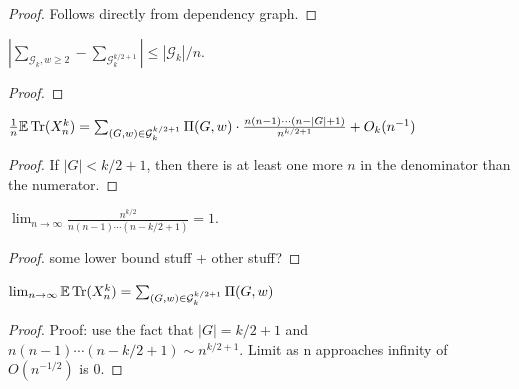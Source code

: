 \begin{proof}
  \notready
  Follows directly from dependency graph.
\end{proof}



\begin{proposition}
  \label{prop:g_difference_bound}
  \notready
  $|\sum_{\mathcal{G}_{k}, w \ge 2} - \sum_{\mathcal{G}_k^{k/2+1}}| \le |\mathcal{G}_k|/n$.
\end{proposition}

\begin{proof}
  \notready
\end{proof}



\begin{proposition}%
  \label{prop:trace_ev_special_g}
  \notready
  $\frac1n{\mathbb{E}}\operatorname{Tr}(X_n^k) = \sum_{(G,w)\in\mathcal{G}^{k/2+1}_k} \Pi(G,w) \cdot \frac{n(n-1)\cdots(n-|G|+1)}{n^{k/2+1}} + O_k(n^{-1})$
\end{proposition}

\begin{proof}
  \notready
  If $|G| < k/2 + 1$, then there is at least one more $n$ in the denominator than the numerator.
\end{proof}

\begin{proposition}
  \label{lemma:fraction_limit_one}
  \notready
  $\lim_{n\to\infty}\frac{n^{k/2}}{n(n-1)\cdots(n-k/2+1)} = 1$.
\end{proposition}

\begin{proof}
  \notready
  some lower bound stuff + other stuff?
\end{proof}


\begin{proposition}
  \label{prop:trace_ev_limit_equals_sum}
  \notready
  $\lim_{n\to\infty}{\mathbb{E}}\operatorname{Tr}(X_n^k) = \sum_{(G,w)\in\mathcal{G}^{k/2+1}_k} \Pi(G,w)$
\end{proposition}

\begin{proof}
  \notready
  Proof: use the fact that $|G|=k/2+1$ and $n(n-1)\cdots(n-k/2+1) \sim n^{k/2+1}$. Limit as n approaches infinity of $O(n^{-1/2})$ is 0.
\end{proof}




